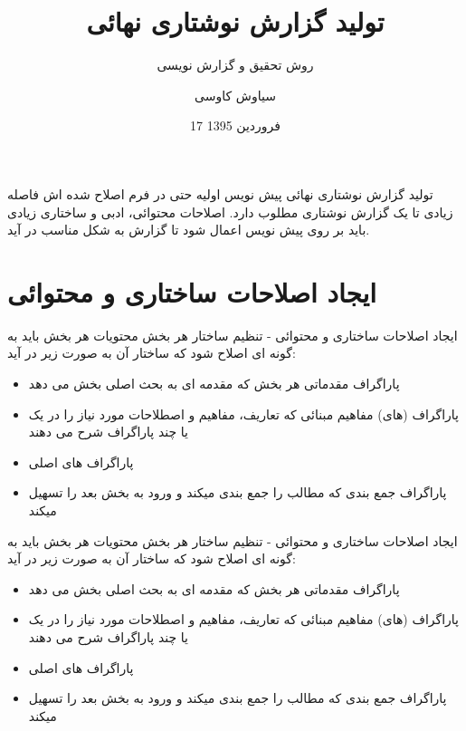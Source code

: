 \documentclass[14pt]{beamer}
\title{تولید گزارش نوشتاری نهائی}
\subtitle{\color{brown} روش تحقیق و گزارش نویسی}
\date{17 فروردین 1395}
\author{سیاوش کاوسی}
\institute{دانشگاه صنعتی امیرکبیر}
\makeatletter
\newcommand{\rtlist}{\raggedleft\rightskip\@totalleftmargin}
\newcommand{\sectionfontsize}{\fontsize{22pt}{0pt}\selectfont}
\newcommand{\framefontsizelarge}{\fontsize{18pt}{0pt}\selectfont}
\newcommand{\frametitlefontsize}{\fontsize{20pt}{0pt}\selectfont}
\makeatother
\begin{document}
\begin{persian}
	\maketitle
	\everypar{\rightskip\rightmargin}		
	
	\begin{frame}[plain]{\frametitlefontsize تولید گزارش نوشتاری نهائی}
		\framefontsizelarge
		پیش نویس اولیه حتی در فرم اصلاح شده اش فاصله زیادی تا یک گزارش نوشتاری مطلوب دارد. اصلاحات محتوائی، ادبی و ساختاری زیادی باید بر روی پیش نویس اعمال شود تا گزارش به شکل مناسب در آید.
	\end{frame}	
	
	\section{\sectionfontsize ایجاد اصلاحات ساختاری و محتوائی}	
	
	\begin{frame}[plain]{\frametitlefontsize ایجاد اصلاحات ساختاری و محتوائی - تنظیم ساختار هر بخش}
		\framefontsizelarge
		محتویات هر بخش باید به گونه ای اصلاح شود که ساختار آن به صورت زیر در آید:
		\begin{itemize}\rtlist
			\item پاراگراف مقدماتی هر بخش که مقدمه ای به بحث اصلی بخش می دهد
			\item پاراگراف (های) مفاهیم مبنائی که تعاریف، مفاهیم و اصطلاحات مورد نیاز را در یک یا چند پاراگراف شرح می دهند
			\item پاراگراف های اصلی
			\item پاراگراف جمع بندی که مطالب را جمع بندی میکند و ورود به بخش بعد را تسهیل میکند
		\end{itemize}
	\end{frame}	
	
	\begin{frame}[plain]{\frametitlefontsize ایجاد اصلاحات ساختاری و محتوائی - تنظیم ساختار هر بخش}
		\framefontsizelarge
		محتویات هر بخش باید به گونه ای اصلاح شود که ساختار آن به صورت زیر در آید:
		\begin{itemize}\rtlist
			\item پاراگراف مقدماتی هر بخش که مقدمه ای به بحث اصلی بخش می دهد
			\item پاراگراف (های) مفاهیم مبنائی که تعاریف، مفاهیم و اصطلاحات مورد نیاز را در یک یا چند پاراگراف شرح می دهند
			\item پاراگراف های اصلی
			\item پاراگراف جمع بندی که مطالب را جمع بندی میکند و ورود به بخش بعد را تسهیل میکند
		\end{itemize}
	\end{frame}	
	

\end{persian}
\end{document}
